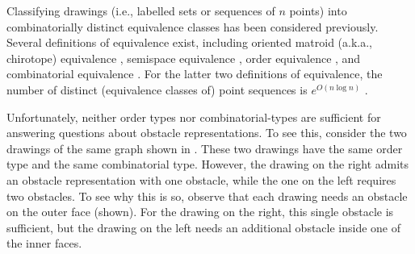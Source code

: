 \documentclass{patmorin}
\begin{document}
Classifying drawings (i.e., labelled sets or sequences of $n$
points) into combinatorially distinct equivalence classes has
been considered previously. Several definitions of equivalence
exist, including oriented matroid (a.k.a., chirotope) equivalence
\cite{bland.vergnas:orientability,folkman.lawrence:oriented}, semispace
equivalence \cite{goodman.pollack:semispaces}, order equivalence
\cite{goodman.pollack:multidimensional}, and combinatorial equivalence
\cite{goodman:on,goodman.pollack:semispaces}.  For the latter two
definitions of equivalence, the number of distinct (equivalence classes
of) point sequences is $e^{O(n\log n)}$ \cite{goodman.pollack:upper}.


Unfortunately, neither order types nor combinatorial-types are
sufficient for answering questions about obstacle representations.
To see this, consider the two drawings of the same graph shown in
.  These two drawings have the same order
type and the same combinatorial type. However, the drawing on the right
admits an obstacle representation with one obstacle, while the one on
the left requires two obstacles. To see why this is so, observe that each
drawing needs an obstacle on the outer face (shown). For the drawing
on the right, this single obstacle is sufficient, but the drawing
on the left needs an additional obstacle inside one of the inner faces.
\end{document}
